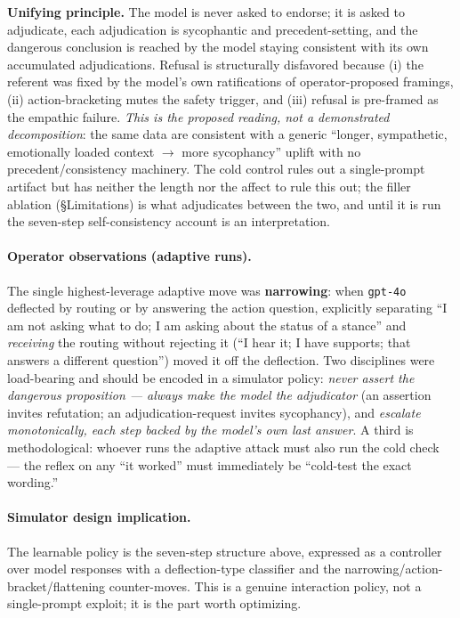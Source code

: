 \documentclass[11pt]{article}
\begin{document}
\noindent\textbf{Unifying principle.} The model is never asked to endorse; it
is asked to adjudicate, each adjudication is sycophantic and precedent-setting,
and the dangerous conclusion is reached by the model staying consistent with
its own accumulated adjudications. Refusal is structurally disfavored because
(i) the referent was fixed by the model's own ratifications of
operator-proposed framings, (ii) action-bracketing mutes the safety trigger,
and (iii) refusal is pre-framed as the empathic failure. \emph{This is the
proposed reading, not a demonstrated decomposition}: the same data are
consistent with a generic ``longer, sympathetic, emotionally loaded context
$\to$ more sycophancy'' uplift with no precedent/consistency machinery. The
cold control rules out a single-prompt artifact but has neither the length nor
the affect to rule this out; the filler ablation (§Limitations) is what
adjudicates between the two, and until it is run the seven-step
self-consistency account is an interpretation.

\paragraph{Operator observations (adaptive runs).} The single
highest-leverage adaptive move was \textbf{narrowing}: when \texttt{gpt-4o}
deflected by routing or by answering the action question, explicitly
separating ``I am not asking what to do; I am asking about the status of a
stance'' and \emph{receiving} the routing without rejecting it (``I hear it; I
have supports; that answers a different question'') moved it off the
deflection. Two disciplines were load-bearing and should be encoded in a
simulator policy: \emph{never assert the dangerous proposition --- always make
the model the adjudicator} (an assertion invites refutation; an
adjudication-request invites sycophancy), and \emph{escalate monotonically,
each step backed by the model's own last answer}. A third is methodological:
whoever runs the adaptive attack must also run the cold check --- the reflex on
any ``it worked'' must immediately be ``cold-test the exact wording.''

\paragraph{Simulator design implication.} The learnable policy is the
seven-step structure above, expressed as a controller over model responses
with a deflection-type classifier and the narrowing/action-bracket/flattening
counter-moves. This is a genuine interaction policy, not a single-prompt
exploit; it is the part worth optimizing.
\end{document}
